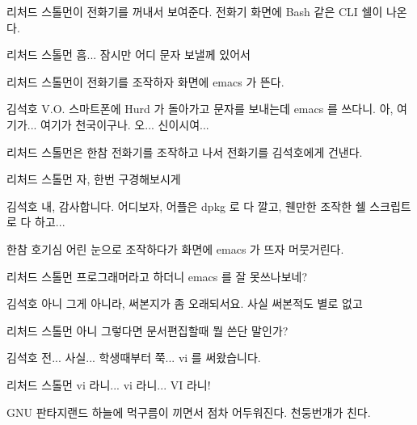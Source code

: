 \documentclass{screenplay}
\begin{document}
    리처드 스톨먼이 전화기를 꺼내서 보여준다. 전화기 화면에 Bash 같은 CLI 쉘이 나온다.
    
    \begin{dialogue}{리처드 스톨먼}
        흠... 잠시만 어디 문자 보낼께 있어서
    \end{dialogue}
    
    리처드 스톨먼이 전화기를 조작하자 화면에 emacs 가 뜬다.
    
    \begin{dialogue}{김석호}
        V.O. 스마트폰에 Hurd 가 돌아가고 문자를 보내는데 emacs 를 쓰다니. 아, 여기가... 여기가 천국이구나. 오... 신이시여...
    \end{dialogue}
    
    리처드 스톨먼은 한참 전화기를 조작하고 나서 전화기를 김석호에게 건낸다.
    
    \begin{dialogue}{리처드 스톨먼}
        자, 한번 구경해보시게
    \end{dialogue}
    \begin{dialogue}{김석호}
        내, 감사합니다. 어디보자, 어플은 dpkg 로 다 깔고, 웬만한 조작한 쉘 스크립트로 다 하고...
    \end{dialogue}
    
    한참 호기심 어린 눈으로 조작하다가 화면에 emacs 가 뜨자 머뭇거린다.
    
    \begin{dialogue}{리처드 스톨먼}
        프로그래머라고 하더니 emacs 를 잘 못쓰나보네?
    \end{dialogue}
    \begin{dialogue}{김석호}
        아니 그게 아니라, 써본지가 좀 오래되서요.
        사실 써본적도 별로 없고
    \end{dialogue}
    \begin{dialogue}{리처드 스톨먼}
        아니 그렇다면 문서편집할때 뭘 쓴단 말인가?
    \end{dialogue}
    \begin{dialogue}[난처해하며]{김석호}
        전... 사실... 학생때부터 쭉... vi 를 써왔습니다.
    \end{dialogue}
    \begin{dialogue}[놀라며]{리처드 스톨먼}
        vi 라니... vi 라니...
        VI 라니!
    \end{dialogue}
    
    GNU 판타지랜드 하늘에 먹구름이 끼면서 점차 어두워진다. 천둥번개가 친다.
    
\end{document}
